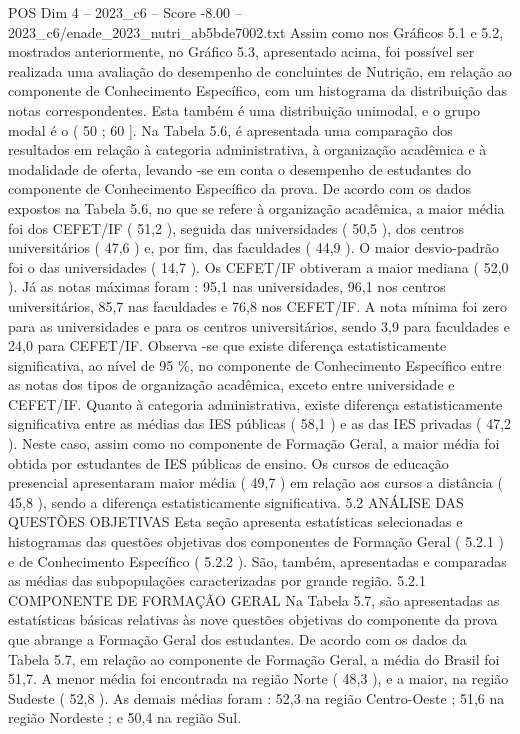 \begin{textsample}{POS Dim 4 – 2023\_c6 – Score -8.00 – 2023\_c6/enade\_2023\_nutri\_ab5bde7002.txt}
Assim como nos Gráficos 5.1 e 5.2, mostrados anteriormente, no Gráfico 5.3, apresentado acima, foi possível ser realizada uma avaliação do desempenho de concluintes de Nutrição, em relação ao componente de Conhecimento Específico, com um histograma da distribuição das notas correspondentes.
Esta também é uma distribuição unimodal, e o grupo modal é o ( 50 ; 60 ].
Na Tabela 5.6, é apresentada uma comparação dos resultados em relação à categoria administrativa, à organização acadêmica e à modalidade de oferta, levando -se em conta o desempenho de estudantes do componente de Conhecimento Específico da prova.
De acordo com os dados expostos na Tabela 5.6, no que se refere à organização acadêmica, a maior média foi dos CEFET/IF ( 51,2 ), seguida das universidades ( 50,5 ), dos centros universitários ( 47,6 ) e, por fim, das faculdades ( 44,9 ).
O maior desvio-padrão foi o das universidades ( 14,7 ).
Os CEFET/IF obtiveram a maior mediana ( 52,0 ).
Já as notas máximas foram : 95,1 nas universidades, 96,1 nos centros universitários, 85,7 nas faculdades e 76,8 nos CEFET/IF.
A nota mínima foi zero para as universidades e para os centros universitários, sendo 3,9 para faculdades e 24,0 para CEFET/IF.
Observa -se que existe diferença estatisticamente significativa, ao nível de 95 \%, no componente de Conhecimento Específico entre as notas dos tipos de organização acadêmica, exceto entre universidade e CEFET/IF.
Quanto à categoria administrativa, existe diferença estatisticamente significativa entre as médias das IES públicas ( 58,1 ) e as das IES privadas ( 47,2 ).
Neste caso, assim como no componente de Formação Geral, a maior média foi obtida por estudantes de IES públicas de ensino.
Os cursos de educação presencial apresentaram maior média ( 49,7 ) em relação aos cursos a distância ( 45,8 ), sendo a diferença estatisticamente significativa. 5.2 ANÁLISE DAS QUESTÕES OBJETIVAS Esta seção apresenta estatísticas selecionadas e histogramas das questões objetivas dos componentes de Formação Geral ( 5.2.1 ) e de Conhecimento Específico ( 5.2.2 ).
São, também, apresentadas e comparadas as médias das subpopulações caracterizadas por grande região. 5.2.1 COMPONENTE DE FORMAÇÃO GERAL Na Tabela 5.7, são apresentadas as estatísticas básicas relativas às nove questões objetivas do componente da prova que abrange a Formação Geral dos estudantes.
De acordo com os dados da Tabela 5.7, em relação ao componente de Formação Geral, a média do Brasil foi 51,7.
A menor média foi encontrada na região Norte ( 48,3 ), e a maior, na região Sudeste ( 52,8 ).
As demais médias foram : 52,3 na região Centro-Oeste ; 51,6 na região Nordeste ; e 50,4 na região Sul.

\end{textsample}

